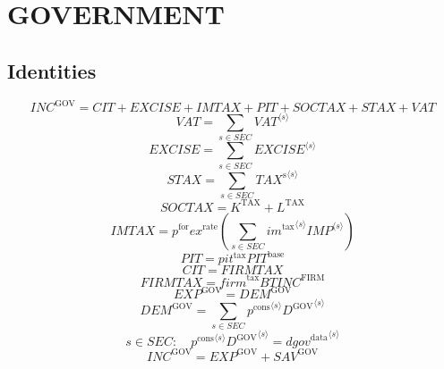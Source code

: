\section{GOVERNMENT}

\subsection{Identities}

\begin{equation}
{I\!N\!C}^{\mathrm{GOV}} = {C\!I\!T} + {E\!X\!C\!I\!S\!E} + {I\!M\!T\!A\!X} + {P\!I\!T} + {S\!O\!C\!T\!A\!X} + {S\!T\!A\!X} + {V\!A\!T}
\end{equation}
\begin{equation}
{V\!A\!T} = \sum_{s\in {S\!E\!C}} {{V\!A\!T}}^{\langle s\rangle}
\end{equation}
\begin{equation}
{E\!X\!C\!I\!S\!E} = \sum_{s\in {S\!E\!C}} {{E\!X\!C\!I\!S\!E}}^{\langle s\rangle}
\end{equation}
\begin{equation}
{S\!T\!A\!X} = \sum_{s\in {S\!E\!C}} {{T\!A\!X}^{\mathrm{s}}}^{\langle s\rangle}
\end{equation}
\begin{equation}
{S\!O\!C\!T\!A\!X} = K^{\mathrm{TAX}} + L^{\mathrm{TAX}}
\end{equation}
\begin{equation}
{I\!M\!T\!A\!X} = {p^{\mathrm{for}}} {{e\!x}^{\mathrm{rate}}} \left(\sum_{s\in {S\!E\!C}} {{{i\!m}^{\mathrm{tax}}}^{\langle s\rangle}} {{{I\!M\!P}}^{\langle s\rangle}}\right)
\end{equation}
\begin{equation}
{P\!I\!T} = {{p\!i\!t}^{\mathrm{tax}}} {{P\!I\!T}^{\mathrm{base}}}
\end{equation}
\begin{equation}
{C\!I\!T} = {F\!I\!R\!M\!T\!A\!X}
\end{equation}
\begin{equation}
{F\!I\!R\!M\!T\!A\!X} = {{f\!i\!r\!m}^{\mathrm{tax}}} {{B\!T\!I\!N\!C}^{\mathrm{FIRM}}}
\end{equation}
\begin{equation}
{E\!X\!P}^{\mathrm{GOV}} = {D\!E\!M}^{\mathrm{GOV}}
\end{equation}
\begin{equation}
{D\!E\!M}^{\mathrm{GOV}} = \sum_{s\in {S\!E\!C}} {{p^{\mathrm{cons}}}^{\langle s\rangle}} {{D^{\mathrm{GOV}}}^{\langle s\rangle}}
\end{equation}
\begin{equation}
s\in {S\!E\!C}\colon\quad {{p^{\mathrm{cons}}}^{\langle s\rangle}} {{D^{\mathrm{GOV}}}^{\langle s\rangle}} = {{d\!g\!o\!v}^{\mathrm{data}}}^{\langle s\rangle}
\end{equation}
\begin{equation}
{I\!N\!C}^{\mathrm{GOV}} = {E\!X\!P}^{\mathrm{GOV}} + {S\!A\!V}^{\mathrm{GOV}}
\end{equation}




